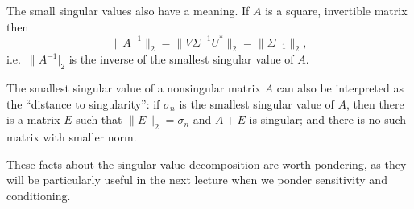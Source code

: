 \documentclass[12pt, leqno]{article} %
\begin{document}
The small singular values also have a meaning.  If $A$ is a square,
invertible matrix then
\[
  \|A^{-1}\|_2 = \|V \Sigma^{-1} U^*\|_2 = \|\Sigma_{-1}\|_2,
\]
i.e.~$\|A^{-1}|_2$ is the inverse of the smallest singular value of $A$.

The smallest singular value of a nonsingular matrix $A$ can also be
interpreted as the ``distance to singularity'': if $\sigma_n$ is the
smallest singular value of $A$, then there is a matrix $E$ such that
$\|E\|_2 = \sigma_n$ and $A+E$ is singular; and there is no such
matrix with smaller norm.

These facts about the singular value decomposition are worth
pondering, as they will be particularly useful in the next lecture
when we ponder sensitivity and conditioning.



\end{document}
